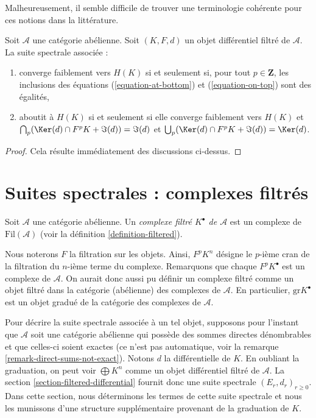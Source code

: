 \noindent
Malheureusement, il semble difficile de trouver une terminologie cohérente pour ces
notions dans la littérature.

\begin{lemma}
\label{lemma-filtered-differential-ss-converges}
Soit $\mathcal{A}$ une catégorie abélienne.
Soit $(K, F, d)$ un objet différentiel filtré de $\mathcal{A}$.
La suite spectrale associée :
\begin{enumerate}
\item converge faiblement vers $H(K)$ si et seulement si, pour tout
$p \in \mathbf{Z}$, les inclusions des équations
(\ref{equation-at-bottom}) et (\ref{equation-on-top}) sont des égalités,
\item aboutit à $H(K)$ si et seulement si elle converge faiblement vers $H(K)$ et
$\bigcap_p (\Ker(d) \cap F^pK + \Im(d)) = \Im(d)$
et $\bigcup_p (\Ker(d) \cap F^pK + \Im(d)) = \Ker(d)$.
\end{enumerate}
\end{lemma}

\begin{proof}
Cela résulte immédiatement des discussions ci-dessus.
\end{proof}
\section{Suites spectrales : complexes filtrés}
\label{section-filtered-complex}

\begin{definition}
\label{definition-filtered-complex}
Soit $\mathcal{A}$ une catégorie abélienne.
Un {\it complexe filtré $K^\bullet$ de $\mathcal{A}$}
est un complexe de $\text{Fil}(\mathcal{A})$ (voir la
définition \ref{definition-filtered}).
\end{definition}

\noindent
Nous noterons $F$ la filtration sur les objets. Ainsi,
$F^pK^n$ désigne le $p$-ième cran de la filtration du $n$-ième terme du
complexe. Remarquons que chaque $F^pK^\bullet$ est un complexe de $\mathcal{A}$.
On aurait donc aussi pu définir un complexe filtré comme un objet filtré
dans la catégorie (abélienne) des complexes de $\mathcal{A}$.
En particulier, $\text{gr} K^\bullet$ est un objet gradué de la
catégorie des complexes de $\mathcal{A}$.

\medskip\noindent
Pour décrire la suite spectrale associée à un tel objet,
supposons pour l'instant que $\mathcal{A}$ soit une catégorie abélienne
qui possède des sommes directes dénombrables et que celles-ci soient exactes
(ce n'est pas automatique, voir la remarque \ref{remark-direct-sums-not-exact}).
Notons $d$ la différentielle de $K$. En oubliant la graduation,
on peut voir $\bigoplus K^n$ comme un objet différentiel filtré de
$\mathcal{A}$. La section \ref{section-filtered-differential}
fournit donc une suite spectrale $(E_r, d_r)_{r \geq 0}$. Dans cette section,
nous déterminons les termes de cette suite spectrale et nous les munissons
d'une structure supplémentaire provenant de la
graduation de $K$.

